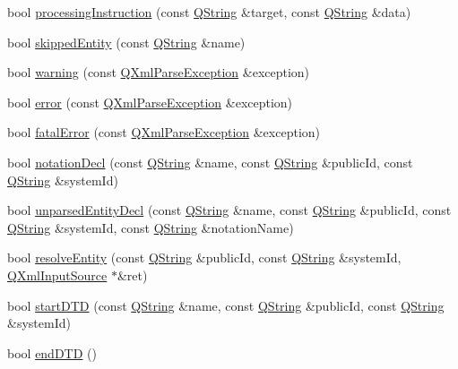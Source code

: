 \begin{DoxyCompactItemize}
\item 
bool \hyperlink{class_q_xml_default_handler_a31bcaeada22dde72e4b2b59f859f90c5}{processing\-Instruction} (const \hyperlink{class_q_string}{Q\-String} \&target, const \hyperlink{class_q_string}{Q\-String} \&data)
\item 
bool \hyperlink{class_q_xml_default_handler_a26a7987789d542b12799ef6f3696f86c}{skipped\-Entity} (const \hyperlink{class_q_string}{Q\-String} \&name)
\item 
bool \hyperlink{class_q_xml_default_handler_aed90bd0b5272f7a5042451fa8f20c5ba}{warning} (const \hyperlink{class_q_xml_parse_exception}{Q\-Xml\-Parse\-Exception} \&exception)
\item 
bool \hyperlink{class_q_xml_default_handler_a17e6cc63b7ee45c29ef1883227aa3ef8}{error} (const \hyperlink{class_q_xml_parse_exception}{Q\-Xml\-Parse\-Exception} \&exception)
\item 
bool \hyperlink{class_q_xml_default_handler_afe3fbf09765011104e0d12ee0d395619}{fatal\-Error} (const \hyperlink{class_q_xml_parse_exception}{Q\-Xml\-Parse\-Exception} \&exception)
\item 
bool \hyperlink{class_q_xml_default_handler_a40a0f45b7aa7ea980734fa14620ce0d6}{notation\-Decl} (const \hyperlink{class_q_string}{Q\-String} \&name, const \hyperlink{class_q_string}{Q\-String} \&public\-Id, const \hyperlink{class_q_string}{Q\-String} \&system\-Id)
\item 
bool \hyperlink{class_q_xml_default_handler_a12e1b778be582d7959bf09a9242390e2}{unparsed\-Entity\-Decl} (const \hyperlink{class_q_string}{Q\-String} \&name, const \hyperlink{class_q_string}{Q\-String} \&public\-Id, const \hyperlink{class_q_string}{Q\-String} \&system\-Id, const \hyperlink{class_q_string}{Q\-String} \&notation\-Name)
\item 
bool \hyperlink{class_q_xml_default_handler_a838be71a40beadc4eac9429fd727c9e8}{resolve\-Entity} (const \hyperlink{class_q_string}{Q\-String} \&public\-Id, const \hyperlink{class_q_string}{Q\-String} \&system\-Id, \hyperlink{class_q_xml_input_source}{Q\-Xml\-Input\-Source} $\ast$\&ret)
\item 
bool \hyperlink{class_q_xml_default_handler_a4e6d659ffbcf1382f9ac908f987512ae}{start\-D\-T\-D} (const \hyperlink{class_q_string}{Q\-String} \&name, const \hyperlink{class_q_string}{Q\-String} \&public\-Id, const \hyperlink{class_q_string}{Q\-String} \&system\-Id)
\item 
bool \hyperlink{class_q_xml_default_handler_afdbb98bf201ef5e358e6b175958e3433}{end\-D\-T\-D} ()
\item 

\end{DoxyCompactItemize}

